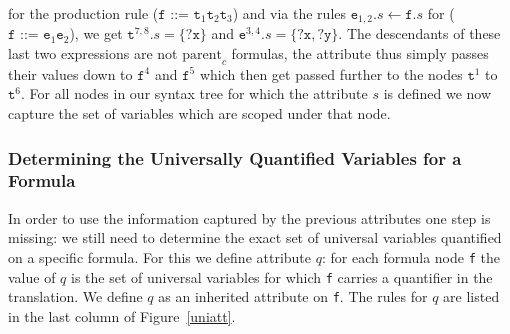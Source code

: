 for the production rule
($\texttt{f ::= t}_1\texttt{t}_2\texttt{t}_3$)
and via the rules $\texttt{e}_{1,2}.s\leftarrow \texttt{f}.s$ for ($\texttt{f ::= e}_1\texttt{e}_2$), we get $\texttt{t}^{7,8}.s= \{\texttt{?x}\}$ and
 $\texttt{e}^{3,4}.s=\{\texttt{?x},\texttt{?y}\}$. %
The descendants of these last two expressions are not $\text{parent}_c$ formulas, the attribute thus simply passes their values down to $\texttt{f}^4$ and $\texttt{f}^5$ which then get passed further to
the nodes
 $\texttt{t}^1$ to $\texttt{t}^6$. %
For all nodes in our syntax tree for which the attribute $s$ is defined we now capture the set of variables which are scoped under that node.



\subsubsection*{Determining the Universally Quantified Variables for a Formula }
In order to use the information captured by the previous attributes one step is missing: we still need to determine the exact set of universal variables quantified
on a specific formula. For this we define attribute $q$:  %
for each formula node \texttt{f} the value of $q$ is  
the set of universal variables 
for which \texttt{f} carries a quantifier in the translation. We define $q$ as an inherited attribute on \texttt{f}. The rules for $q$ are listed
in the last column of Figure~\ref{uniatt}. 

